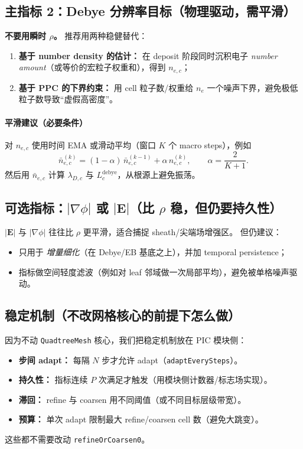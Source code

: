 \documentclass[UTF8,11pt,a4paper]{ctexart}
\begin{document}
\subsection{主指标 2：Debye 分辨率目标（物理驱动，需平滑）}
\textbf{不要用瞬时 $\rho$。} 推荐用两种稳健替代：
\begin{enumerate}[leftmargin=1.6em]
  \item \textbf{基于 number density 的估计：} 在 deposit 阶段同时沉积电子 \emph{number amount}（或等价的宏粒子权重和），得到 $n_{e,c}$；
  \item \textbf{基于 PPC 的下界约束：} 用 cell 粒子数/权重给 $n_e$ 一个噪声下界，避免极低粒子数导致“虚假高密度”。
\end{enumerate}

\paragraph{平滑建议（必要条件）}
对 $n_{e,c}$ 使用时间 EMA 或滑动平均（窗口 $K$ 个 macro steps），例如
\begin{equation}
\bar n_{e,c}^{(k)} = (1-\alpha)\,\bar n_{e,c}^{(k-1)} + \alpha\,n_{e,c}^{(k)},
\qquad \alpha=\frac{2}{K+1}.
\end{equation}
然后用 $\bar n_{e,c}$ 计算 $\lambda_{D,c}$ 与 $L_c^{\mathrm{debye}}$，从根源上避免振荡。

\subsection{可选指标：\texorpdfstring{$|\nabla\phi|$}{|grad phi|} 或 \texorpdfstring{$|\mathbf{E}|$}{|E|}（比 $\rho$ 稳，但仍要持久性）}
$|\mathbf{E}|$ 与 $|\nabla\phi|$ 往往比 $\rho$ 更平滑，适合捕捉 sheath/尖端场增强区。
但仍建议：
\begin{itemize}[leftmargin=1.6em]
  \item 只用于 \emph{增量细化}（在 Debye/EB 基底之上），并加 temporal persistence；
  \item 指标做空间轻度滤波（例如对 leaf 邻域做一次局部平均），避免被单格噪声驱动。
\end{itemize}

\subsection{稳定机制（不改网格核心的前提下怎么做）}
因为不动 \texttt{QuadtreeMesh} 核心，我们把稳定机制放在 PIC 模块侧：
\begin{itemize}[leftmargin=1.6em]
  \item \textbf{步间 adapt：} 每隔 $N$ 步才允许 adapt（\texttt{adaptEverySteps}）。
  \item \textbf{持久性：} 指标连续 $P$ 次满足才触发（用模块侧计数器/标志场实现）。
  \item \textbf{滞回：} refine 与 coarsen 用不同阈值（或不同目标层级带宽）。
  \item \textbf{预算：} 单次 adapt 限制最大 refine/coarsen cell 数（避免大跳变）。
\end{itemize}
这些都不需要改动 \texttt{refineOrCoarsen0}。
\end{document}
